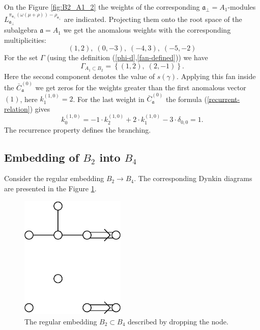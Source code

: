 \documentclass[12pt]{iopart}
\begin{document}
On the Figure \ref{fig:B2_A1_2} the weights of  the corresponding $\mathfrak{a}_{\bot}=A_1$-modules $L^{\pi_{\mathfrak{a}_{\bot}}(\omega(\mu+\rho))-\rho_{\mathfrak{a}_{\bot}}}_{\mathfrak{a}_{\bot}}$ are indicated. Projecting them onto the root space of the subalgebra $\mathfrak{a}=A_1$ we get the anomalous weights with the corresponding multiplicities:
\begin{equation}
  \label{eq:25}
  (1,2),\; (0,-3),\; (-4,3),\; (-5,-2)
\end{equation}
For the set $\Gamma$ (using the definition (\ref{phi-d},\ref{fan-defined})) we have
\begin{equation}
  \label{eq:22}
  \Gamma_{A_1\subset B_2}=\left\{ (1,2),\; (2,-1) \right\}.
\end{equation}
Here the second component denotes the value of $s(\gamma)$. Applying this fan inside the $\bar{C}^{(0)}_{\mathfrak{a}}$ we get zeros for the weights greater than the first anomalous vector $(1)$, here $k^{(1,0)}_1=2$. For the last weight in $\bar{C}^{(0)}_{\mathfrak{a}}$ the formula (\ref{recurrent-relation}) gives
\begin{equation}
  \label{eq:23}
  k^{(1,0)}_{0}=-1\cdot k^{(1,0)}_2 +2\cdot k^{(1,0)}_1 - 3\cdot \delta_{0,0} = 1.
\end{equation}
The recurrence property defines the branching.

\subsection{Embedding of $B_2$ into $B_4$}
\label{sec:someth-high-dimens}
Consider the regular embedding $B_2 \longrightarrow B_4$.
The corresponding Dynkin diagrams are presented in the Figure \ref{fig:dynkin}.
\begin{figure}[h]
  \centering
  \includegraphics[width=50mm]{figure3.eps}
  \caption{The regular embedding $B_2\subset B_4$ described by dropping the node.}
  \label{fig:dynkin}
\end{figure}
\end{document}
